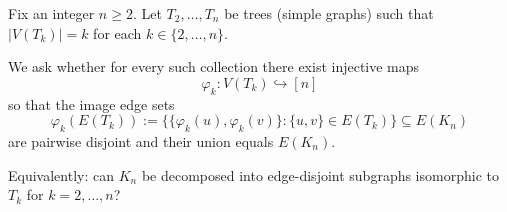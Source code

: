 Fix an integer $n\ge 2$. Let $T_2,\dots,T_n$ be trees (simple graphs) such that $|V(T_k)|=k$ for each $k\in\{2,\dots,n\}$.

We ask whether for every such collection there exist injective maps
\[\varphi_k:V(T_k)\hookrightarrow [n]\]
so that the image edge sets
\[\varphi_k(E(T_k)):=\{\{\varphi_k(u),\varphi_k(v)\}:\{u,v\}\in E(T_k)\}
\subseteq E(K_n)
\]
are pairwise disjoint and their union equals $E(K_n)$.

Equivalently: can $K_n$ be decomposed into edge-disjoint subgraphs isomorphic to $T_k$ for $k=2,\dots,n$?
